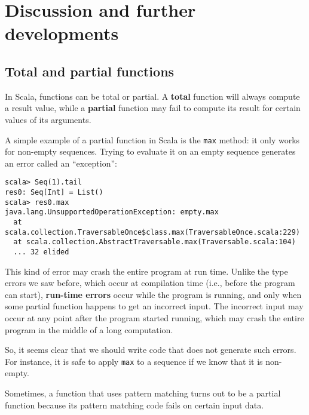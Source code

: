\section{Discussion and further developments}

\subsection{Total and partial functions}

In Scala, functions can be total or partial. A \textbf{total}
function will always compute a result value, while a \textbf{partial}
function may fail to compute its result for certain values of its
arguments.

A simple example of a partial function in Scala is the \lstinline!max!
method: it only works for non-empty sequences. Trying to evaluate
it on an empty sequence generates an error called an \textsf{``}exception\textsf{''}:
\begin{lstlisting}[mathescape=false]
scala> Seq(1).tail
res0: Seq[Int] = List()
scala> res0.max
java.lang.UnsupportedOperationException: empty.max
  at scala.collection.TraversableOnce$class.max(TraversableOnce.scala:229)
  at scala.collection.AbstractTraversable.max(Traversable.scala:104)
  ... 32 elided 
\end{lstlisting}
This kind of error may crash the entire program at run time. Unlike
the type errors we saw before, which occur at compilation
time (i.e., before the program can start), \textbf{run-time errors}
occur while the program is running, and only when some partial function
happens to get an incorrect input. The incorrect input may occur at
any point after the program started running, which may crash the entire
program in the middle of a long computation.

So, it seems clear that we should write code that does not generate
such errors. For instance, it is safe to apply \lstinline!max! to
a sequence if we know that it is non-empty.

Sometimes, a function that uses pattern matching turns out to be a
partial function because its pattern matching code fails on certain
input data. 

